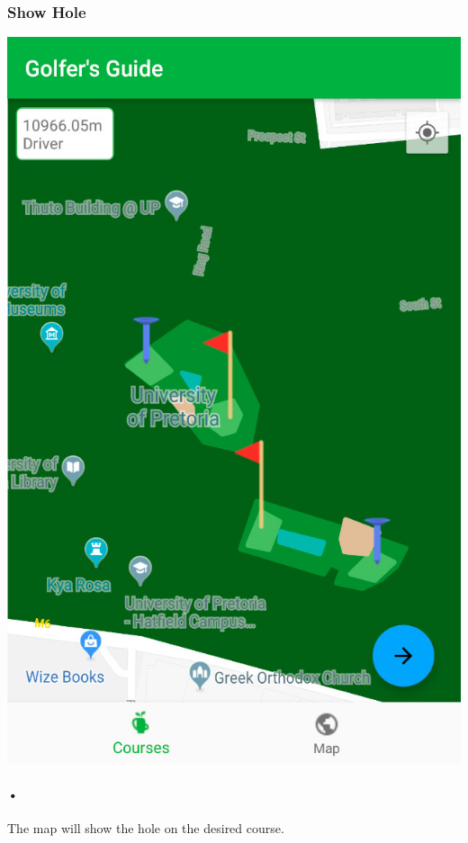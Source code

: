 \documentclass{article}
\begin{document}
	\subsubsection{Show Hole}
	\includegraphics[scale=0.7]{3_course}
	\paragraph{•}
	The map will show the hole on the desired course. 
	
\end{document}
